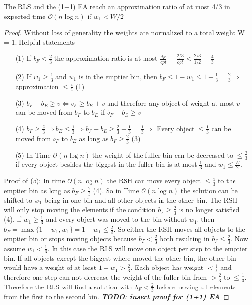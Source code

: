 \begin{lemma}\label{approximationLemma}
    The RLS and the (1+1) EA reach an approximation ratio of at most 4/3 in expected time $\mathcal{O}(n\log{}n)$ if $w_1 < W/2$
\end{lemma}
\begin{proof}
    Without loss of generality the weights are normalized to a total weight W = 1.
    \newline Helpful statements
    \begin{itemize}
        \item[(1)]\label{helpPoint1} If \(b_F \le \frac{2}{3}\) the approximation ratio is at most \(\frac{b_F}{opt} = \frac{2/3}{opt} \le \frac{2/3}{1/2} = \frac{4}{3}\)
        \item[(2)]\label{helpPoint2} If \(w_1 \ge \frac{1}{3}\) and \(w_1\) is in the emptier bin, then \( b_F \le 1 - w_1 \le 1 - \frac{1}{3} = \frac{2}{3} \Rightarrow\) approximation  \(\le \frac{4}{3}\) (1)
        \item[(3)]\label{helpPoint3} \(b_F - b_E \ge v \Leftrightarrow b_F \ge b_E + v\) and therefore any object of weight at most $v$ can be moved from $b_F$ to $b_E$ if \(b_F - b_E \ge v\)
        \item[(4)]\label{helpPoint4} \(b_F \ge \frac{2}{3} \Rightarrow b_E \le \frac{1}{3} \Rightarrow b_F - b_E \ge \frac{2}{3} - \frac{1}{3} = \frac{1}{3} \Rightarrow\) Every object \(\le \frac{1}{3}\) can be moved from $b_F$ to $b_E$ as long as \(b_F \ge \frac{2}{3}\) (3)
        \item[(5)]\label{helpPoint5} In Time $\mathcal{O}(n\log{}n)$ the weight of the fuller bin can be decreased to \(\le \frac{2}{3}\) if every object besides the biggest in the fuller bin is at most $\frac{1}{3}$ and \(w_1 \le \frac{W}{2}\).
    \end{itemize}
    Proof of (5): \newline
    In time $\mathcal{O}(n\log{}n)$ the RSH can move every object $\le \frac{1}{3}$ to the emptier bin as long as $b_F \ge \frac{2}{3}$ (4). So in Time $\mathcal{O}(n\log{}n)$ the solution can be shifted to $w_1$ being in one bin and all other objects in the other bin. The RSH will only stop moving the elements if the condition $b_F \ge \frac{2}{3}$ is no longer satisfied (4). If \(w_1 \ge \frac{1}{3}\) and every object was moved to the bin without $w_1$, then \(b_F = \max\{1-w_1, w_1\} = 1-w_1 \le \frac{2}{3}\). So either the RSH moves all objects to the emptier bin or stops moving objects because $b_F < \frac{2}{3}$ both resulting in $b_F \le \frac{2}{3}$.\newline
    Now assume \(w_1 < \frac{1}{3}\). In this case the RLS will move one object per step to the emptier bin. If all objects except the biggest where moved the other bin, the other bin would have a weight of at least \(1-w_1 > \frac{2}{3}\). Each object has weight $< \frac{1}{3}$ and therefore one step can not decrease the weight of the fuller bin from $> \frac{2}{3}$ to $\le \frac{1}{3}$. Therefore the RLS will find a solution with $b_F < \frac{2}{3}$ before moving all elements from the first to the second bin. \textbf{\textit{TODO: insert proof for (1+1) EA}}



\end{proof}
